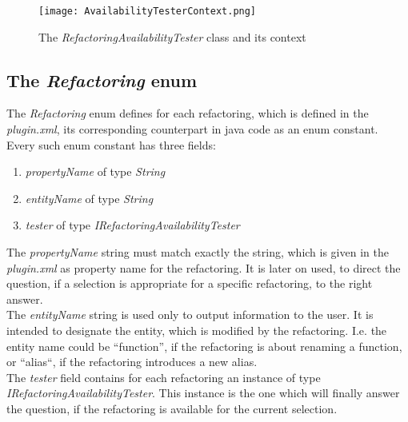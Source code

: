 \documentclass[a4paper,10pt]{report}
\begin{document}
\begin{figure}[h]
\centering
\texttt{[image: AvailabilityTesterContext.png]}
\caption{The {\it RefactoringAvailabilityTester} class and its context}
\label{AvailabilityTesterContext}
\end{figure}

\subsection{The {\it Refactoring} enum}
The {\it Refactoring} enum defines for each refactoring, which is defined in the {\it plugin.xml}, its corresponding counterpart in java code as an enum constant.
Every such enum constant has three fields:
   \begin{enumerate}
     \item {\it propertyName} of type {\it String}
     \item {\it entityName} of type {\it String}
     \item {\it tester}  of type {\it IRefactoringAvailabilityTester}
   \end{enumerate}
The {\it propertyName} string must match exactly the string, which is given in the {\it plugin.xml} as property name for the refactoring. 
It is later on used, to direct the question, if a selection is appropriate for a specific refactoring, to the right answer.\\
The {\it entityName} string is used only to output information to the user. It is intended to designate the entity, which is modified by the refactoring. I.e. the entity name could be ``function'', if the refactoring is about renaming a function, or ``alias``, if the refactoring introduces a new alias.\\
The {\it tester} field contains for each refactoring an instance of type {\it IRefactoringAvailabilityTester}. This instance is the one which will finally answer the question, if the refactoring is available for the current selection.
\end{document}

